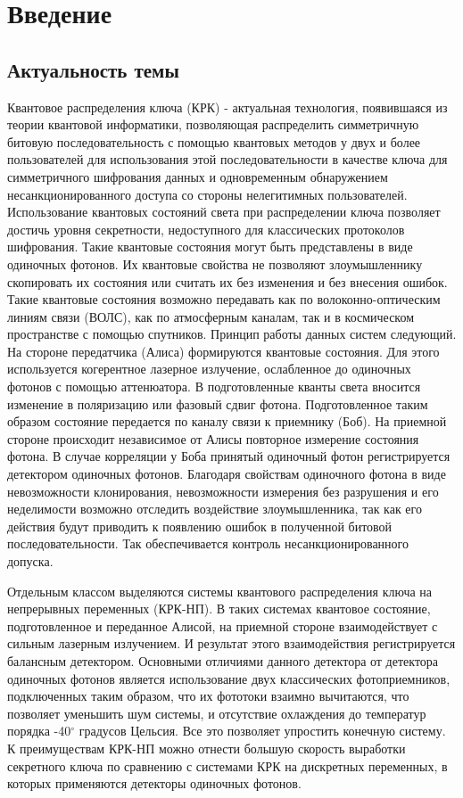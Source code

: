 \chapter*{Введение}                         %
\noindent 
\section*{Актуальность темы}
Квантовое распределения ключа (КРК) - актуальная технология, появившаяся из теории квантовой информатики, позволяющая распределить симметричную битовую последовательность с помощью квантовых методов у двух и более пользователей для использования этой последовательности в качестве ключа для симметричного шифрования данных и одновременным обнаружением несанкционированного доступа со стороны нелегитимных пользователей. Использование квантовых состояний света при распределении ключа позволяет достичь уровня секретности, недоступного для классических протоколов шифрования. Такие квантовые состояния могут быть представлены в виде одиночных фотонов. Их квантовые свойства не позволяют злоумышленнику скопировать их состояния или считать их без изменения и без внесения ошибок. Такие квантовые состояния возможно передавать как по волоконно-оптическим линиям связи (ВОЛС), как по атмосферным каналам, так и в космическом пространстве с помощью спутников. Принцип работы данных систем следующий. На стороне передатчика (Алиса) формируются квантовые состояния. Для этого используется когерентное лазерное излучение, ослабленное до одиночных фотонов с помощью аттенюатора. В подготовленные кванты света вносится изменение в поляризацию или фазовый сдвиг фотона. Подготовленное таким образом состояние передается по каналу связи к приемнику (Боб). На приемной стороне происходит независимое от Алисы повторное измерение состояния фотона. В случае корреляции у Боба принятый одиночный фотон регистрируется детектором одиночных фотонов. Благодаря свойствам одиночного фотона в виде невозможности клонирования, невозможности измерения без разрушения и его неделимости возможно отследить воздействие злоумышленника, так как его действия будут приводить к появлению ошибок в полученной битовой последовательности. Так обеспечивается контроль несанкционированного допуска. 

Отдельным классом выделяются системы квантового распределения ключа на непрерывных переменных (КРК-НП). В таких системах квантовое состояние, подготовленное и переданное Алисой, на приемной стороне взаимодействует с сильным лазерным излучением. И результат этого взаимодействия регистрируется балансным детектором. Основными отличиями данного детектора от детектора одиночных фотонов является использование двух классических фотоприемников, подключенных таким образом, что их фототоки взаимно вычитаются, что позволяет уменьшить шум системы, и отсутствие охлаждения до температур порядка -40$^{\circ}$  градусов Цельсия. Все это позволяет упростить конечную систему. К преимуществам КРК-НП можно отнести большую скорость выработки секретного ключа по сравнению с системами КРК на дискретных переменных, в которых применяются детекторы одиночных фотонов. 

